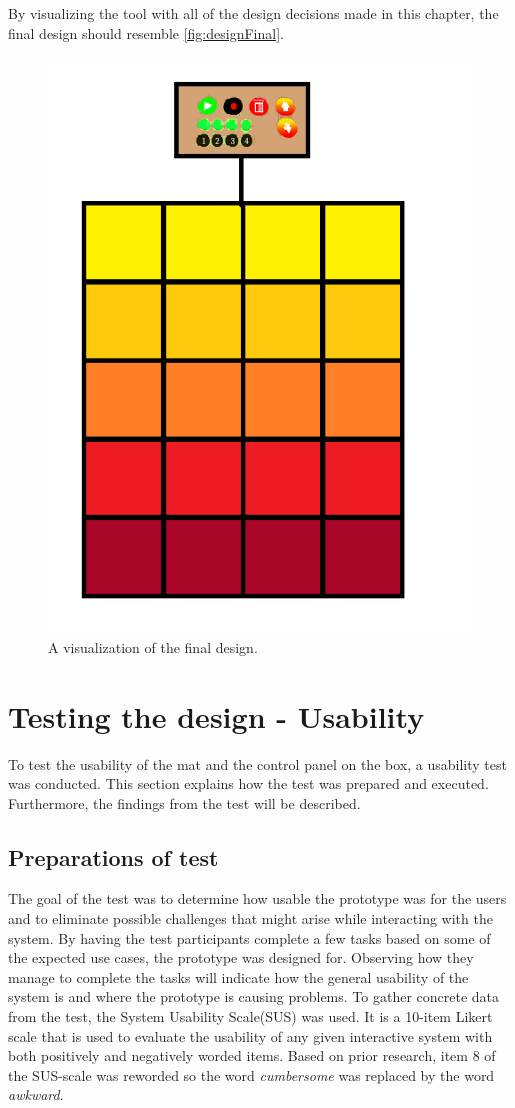 By visualizing the tool with all of the design decisions made in this chapter, the final design should resemble \autoref{fig:designFinal}. 
\begin{figure}[H]
	\centering
	\includegraphics[width=0.7\linewidth]{figure/Design/DesignFinal}
	\caption{A visualization of the final design.}	
	\label{fig:designFinal}
\end{figure}

\section{Testing the design - Usability}\label{sec:designUsability}
To test the usability of the mat and the control panel on the box, a usability test was conducted. This section explains how the test was prepared and executed. Furthermore, the findings from the test will be described.

\subsection{Preparations of test}
The goal of the test was to determine how usable the prototype was for the users and to eliminate possible challenges that might arise while interacting with the system. By having the test participants complete a few tasks based on some of the expected use cases, the prototype was designed for. Observing how they manage to complete the tasks will indicate how the general usability of the system is and where the prototype is causing problems. To gather concrete data from the test, the System Usability Scale(SUS)\cite{susScale} was used. It is a 10-item Likert scale that is used to evaluate the usability of any given interactive system with both positively and negatively worded items. Based on prior research, item 8 of the SUS-scale was reworded so the word \textit{cumbersome} was replaced by the word \textit{awkward}\cite{susScale}.


